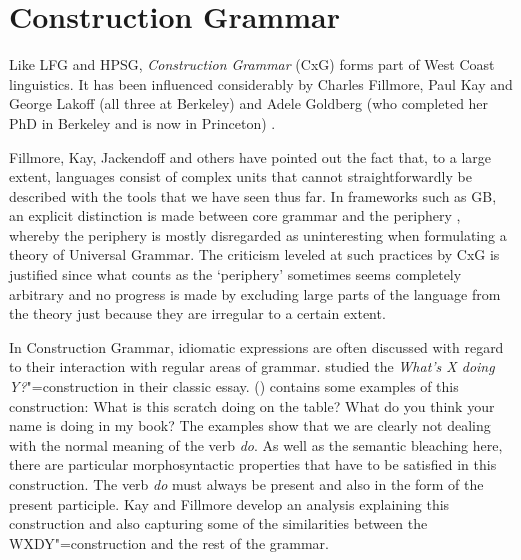 \chapter{Construction Grammar}
\label{Kapitel-CxG}

%
%
%
%


Like LFG and HPSG, \emph{Construction Grammar} (CxG) forms part of West Coast linguistics.
It has been influenced considerably by Charles Fillmore, Paul Kay and George Lakoff (all three at Berkeley) and Adele Goldberg
(who completed her PhD in Berkeley and is now in Princeton)
\citep*{Fillmore88a,FKoC88a,KF99a,Kay2002a,Kay2005a,Goldberg95a,Goldberg2006a}.

Fillmore, Kay, Jackendoff and others have pointed out the fact that, to a large extent, languages consist of complex units that cannot straightforwardly
be described with the tools that we have seen thus far. In frameworks such as GB, an explicit distinction is made between core grammar
and the periphery \citep[]{Chomsky81a}, whereby the periphery is mostly disregarded as uninteresting when formulating a theory
of Universal Grammar. The criticism leveled at such practices by CxG is justified since what counts as the `periphery' sometimes seems completely
arbitrary \citep{MuellerKernigkeit} and no progress is made by excluding large parts of the language
from the theory just because they are irregular to a certain extent.

In Construction Grammar, idiomatic expressions are often discussed with regard to their interaction
with regular areas of grammar. \citet{KF99a} studied the \emph{What's X doing Y?}"=construction in
their classic essay. () contains some examples of this construction: 
\eal
\ex What is this scratch doing on the table?
\ex What do you think your name is doing in my book?
\zl
The examples show that we are clearly not dealing with the normal meaning of the verb \emph{do}. As well as the semantic bleaching here,
there are particular morphosyntactic properties that have to be satisfied in this construction. The verb \emph{do} must always be present
and also in the form of the present participle. Kay and Fillmore develop an analysis explaining this construction and also capturing some
of the similarities between the WXDY"=construction and the rest of the grammar.


